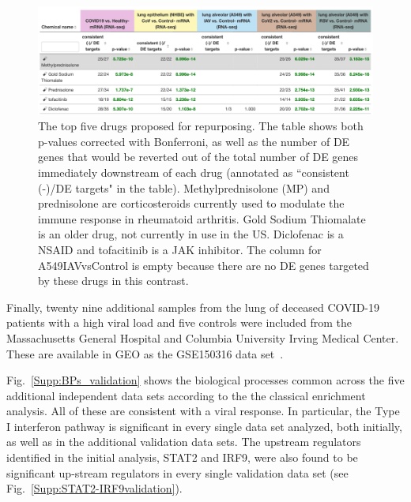 \documentclass[Minh_PhD_thesis.tex]{subfiles}
\begin{document}
\begin{figure}
\centering
	\includegraphics[width=1\linewidth]{../Figures/top5drugs.png}
    \caption{ The top five drugs proposed for repurposing. The table shows both p-values corrected with Bonferroni, as well as the number of DE genes that would be reverted out of the total number of  DE genes immediately downstream  of each drug (annotated as ``consistent (-)/DE targets" in the table).  Methylprednisolone (MP) and prednisolone are corticosteroids currently used to modulate the immune response in rheumatoid arthritis. Gold Sodium Thiomalate is an older drug, not currently in use in the US. Diclofenac is a NSAID and tofacitinib is a JAK inhibitor. The column for A549IAVvsControl is empty because there are no DE genes targeted by these drugs in this contrast.  }
        \label{top5drugs}
\end{figure} 

Finally, twenty nine additional samples from the lung of deceased COVID-19 patients with a high viral load and five controls were included from the Massachusetts General Hospital and Columbia University Irving Medical Center. These are available in GEO as the GSE150316 data set~\cite{desai2020temporal}.

 
Fig.~\ref{Supp:BPs_validation}  shows the biological processes common across the five additional independent data sets according to the the classical enrichment analysis. All of these are consistent with a viral response. In particular, the Type I interferon pathway is significant in every single data set analyzed, both initially, as well as in the additional validation data sets. The upstream regulators identified in the initial analysis, STAT2 and IRF9, were also found to be significant up-stream regulators in every single validation data set (see Fig.~\ref{Supp:STAT2-IRF9validation}).
\end{document}
